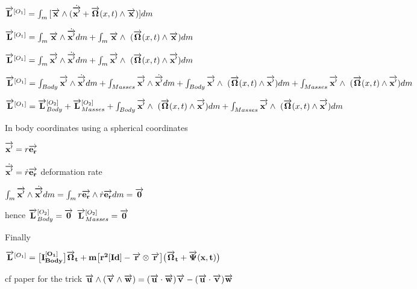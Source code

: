 $\overrightarrow{\bf L}^{[O_1]}=\int_{m}{[\overrightarrow{\bf x}\wedge(\dot{\overrightarrow{\bf x'}}+\overrightarrow{\bf \Omega}(x,t) \wedge \overrightarrow{\bf x})]}dm$

$\overrightarrow{\bf L}^{[O_1]}=\int_{m}{\overrightarrow{\bf x}\wedge\dot{\overrightarrow{\bf x'}}}dm+\int_{m}{\overrightarrow{\bf x}\wedge\ (\overrightarrow{\bf \Omega}(x,t) \wedge \overrightarrow{\bf x})}dm$

$\overrightarrow{\bf L}^{[O_1]}=\int_{m}{\overrightarrow{\bf x'}\wedge\dot{\overrightarrow{\bf x'}}}dm+\int_{m}{\overrightarrow{\bf x'}\wedge\ (\overrightarrow{\bf \Omega}(x,t) \wedge \overrightarrow{\bf x'})}dm$

$\overrightarrow{\bf L}^{[O_1]}=\int_{Body}{\overrightarrow{\bf x'}\wedge\dot{\overrightarrow{\bf x'}}}dm+\int_{Masses}{\overrightarrow{\bf x'}\wedge\dot{\overrightarrow{\bf x'}}}dm+\int_{Body}{\overrightarrow{\bf x'}\wedge\ (\overrightarrow{\bf \Omega}(x,t) \wedge \overrightarrow{\bf x'})}dm+\int_{Masses}{\overrightarrow{\bf x'}\wedge\ (\overrightarrow{\bf \Omega}(x,t) \wedge \overrightarrow{\bf x'})}dm$

$\overrightarrow{\bf L}^{[O_1]}=\overrightarrow{\bf L}^{[O_2]}_{Body}+\overrightarrow{\bf L}^{[O_2]}_{Masses}+\int_{Body}{\overrightarrow{\bf x'}\wedge\ (\overrightarrow{\bf \Omega}(x,t) \wedge \overrightarrow{\bf x'})}dm+\int_{Masses}{\overrightarrow{\bf x'}\wedge\ (\overrightarrow{\bf \Omega}(x,t) \wedge \overrightarrow{\bf x'})}dm$

In body coordinates using a spherical coordinates

$\overrightarrow{\bf x'}=r\overrightarrow{\bf e_r}$

$\dot{\overrightarrow{\bf x'}}=\dot{r}\overrightarrow{\bf e_r}$ deformation rate

$\int_{m}{\overrightarrow{\bf x'}\wedge\dot{\overrightarrow{\bf x'}}}dm=\int_{m}{r\overrightarrow{\bf e_r}\wedge\dot{r}\overrightarrow{\bf e_r}}dm=\overrightarrow{\bf 0}$

hence
$\overrightarrow{\bf L}^{[O_2]}_{Body}=\overrightarrow{\bf 0}$
$\overrightarrow{\bf L}^{[O_2]}_{Masses}=\overrightarrow{\bf 0}$

Finally

$\overrightarrow{\bf L}^{[O_1]}=\big[\bf I^{[O_1]}_{Body}\big] \overrightarrow{\bf \Omega}_{t} +m \big[r^2 [\bf Id]-\overrightarrow{\bf r}  \otimes \overrightarrow{\bf r} \big]\big(\overrightarrow{\bf \Omega}_{t}+\overrightarrow{\bf \Psi}(x,t)\big) $

cf paper for the trick
$\overrightarrow{\bf u} \wedge (\overrightarrow{\bf v} \wedge \overrightarrow{\bf w})=(\overrightarrow{\bf u} \cdot \overrightarrow{\bf w}) \overrightarrow{\bf v} - (\overrightarrow{\bf u} \cdot \overrightarrow{\bf v}) \overrightarrow{\bf w}$


